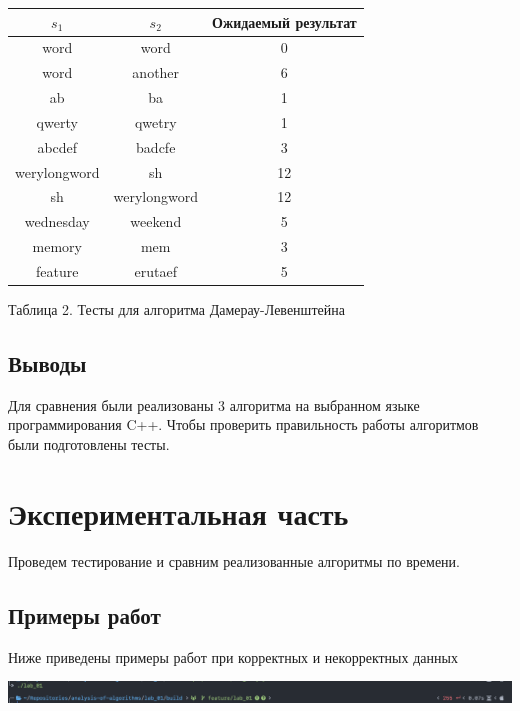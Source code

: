 \documentclass[a4paper,12pt]{article}
\begin{document}
\hfill

\begin{center}
    \begin{tabular}{|c|c|c|}
        \hline
        $s_1$ & $s_2$ & Ожидаемый результат \\
        \hline
        word & word & 0 \\
        \hline
        word & another & 6 \\
        \hline
        ab & ba & 1 \\
        \hline
        qwerty & qwetry & 1 \\
        \hline
        abcdef & badcfe & 3 \\
        \hline
        werylongword & sh & 12 \\
        \hline
        sh & werylongword & 12 \\
        \hline
        wednesday & weekend & 5 \\
        \hline
        memory & mem & 3 \\
        \hline
        feature & erutaef & 5 \\
        \hline
    \end{tabular}

    Таблица 2. Тесты для алгоритма Дамерау-Левенштейна
\end{center}

\subsection{Выводы}

Для сравнения были реализованы 3 алгоритма на выбранном языке
программирования C++. Чтобы проверить правильность работы алгоритмов
были подготовлены тесты.

\newpage
\section{Экспериментальная часть}

Проведем тестирование и сравним реализованные алгоритмы по времени.

\subsection{Примеры работ}

Ниже приведены примеры работ при корректных и некорректных данных

\includegraphics[scale=0.35]{zero_arg}
\end{document}
